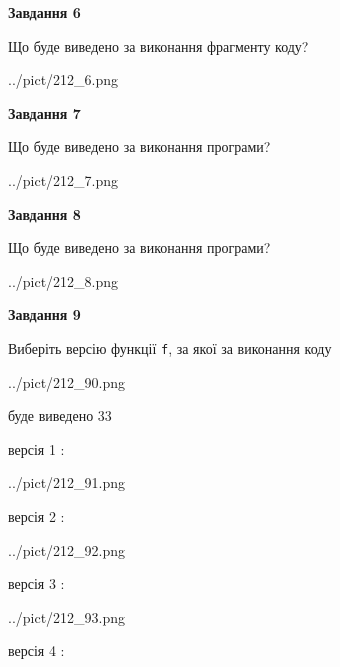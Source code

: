 \documentclass[12pt, ukrainian]{article}
\def\code#1{\Verb!#1!}
\begin{document}
{\begin {large}
{\begin {center}\textbf{Завдання 6}\end {center}}

Що буде виведено за виконання фрагменту коду?\par
\begin{center}
	{../pict/212_6.png}
\end{center}
\newpage

{\begin {center}\textbf{Завдання 7}\end {center}}

Що буде виведено за виконання програми?\par
\begin{center}
	{../pict/212_7.png}
\end{center}
\newpage

{\begin {center}\textbf{Завдання 8}\end {center}}

Що буде виведено за виконання програми?\par
\begin{center}
	{../pict/212_8.png}
\end{center}
\newpage

{\begin {center}\textbf{Завдання 9}\end {center}}

Виберіть версію функції \code{f}, за якої за виконання коду
\begin{center}
	{../pict/212_90.png}
\end{center}
буде виведено 33

\vspace{5mm}
версія 1 :

\begin{center}
	{../pict/212_91.png}
\end{center}
версія 2 :

\begin{center}
	{../pict/212_92.png}
\end{center}
версія 3 :

\begin{center}
	{../pict/212_93.png}
\end{center}
версія 4 :


\end{large}}
\end{document}
